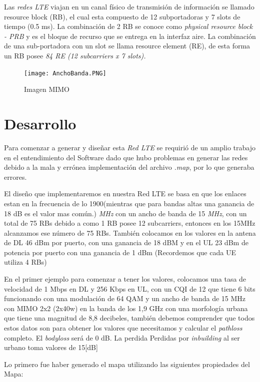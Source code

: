 \documentclass[Article, letterpaper,12pt]{article}
\begin{document}
Las \textit{redes LTE} viajan en un  canal físico de transmisión de información se llamado resource block (RB), el cual esta compuesto de 12 subportadoras y 7 slots de tiempo (0.5 ms). La combinación de 2 RB se conoce como \textit{physical resource block - PRB} y es el bloque de recurso
que se entrega en la interfaz aire. La combinación de una sub-portadora con un slot
se llama resource element (RE), de esta forma un RB posee \textit{84 RE (12 subcarriers
x 7 slots).
}

\begin{figure}[H]
    \centering
    \texttt{[image: AnchoBanda.PNG]}
    \caption{Imagen MIMO}
    \label{fig:my_label}
\end{figure}


\section{Desarrollo}
Para comenzar a generar y diseñar esta \textit{Red LTE} se requirió de un amplio trabajo en el entendimiento del Software dado que hubo problemas en generar las redes debido a la mala y errónea implementación del archivo\textit{ .map}, por lo que generaba errores.

El diseño que implementaremos en nuestra Red LTE se basa en que los enlaces estan en la frecuencia de lo 1900(mientras que para bandas altas una ganancia de 18 dB es el valor mas común.) \textit{MHz} con un ancho de banda de 15 \textit{MHz}, con un total de 75 RBs debido a como 1 RB posee 12 subcarriers, entonces en los 15MHz alcanzamos ese número de 75 RBs.
También colocamos en los valores en la antena de DL 46 dBm por puerto, con una ganancia de 18 dBM y en el UL 23 dBm de potencia por puerto con una ganancia de 1 dBm (Recordemos que cada UE utiliza 4 RBs)


En el primer ejemplo para comenzar a tener los valores, colocamos una tasa de velocidad de 1 Mbps en DL y 256 Kbps en UL, con un CQI de 12 que tiene 6 bits funcionando con una modulación  de 64 QAM y un ancho de banda de 15 MHz con MIMO 2x2 (2x40w) en la banda de los
1,9 GHz con una morfología urbana que tiene una magnitud de 8,8 decibeles, también debemos comprender que todos estos datos son para obtener los valores que necesitamos y calcular el \textit{pathloss}  completo.
El \textit{bodyloss} será de 0 dB.
La perdida Perdidas por \textit{inbuilding} al ser urbano toma valores de 15[dB]

Lo primero fue haber generado el mapa utilizando las siguientes propiedades del Mapa:
\end{document}

